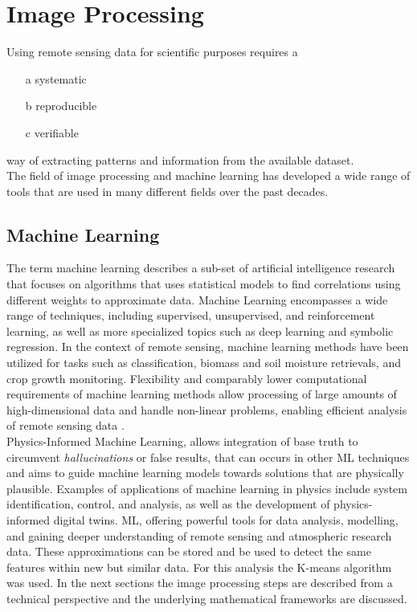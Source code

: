 \documentclass[12pt,a4paper, english,twoside]{scrartcl}
\begin{document}
\section{Image Processing}\label{sec:imgProcessing}
    Using remote sensing data for scientific purposes requires a 
    \begin{itemize} 
      \item[a] systematic
      \item[b] reproducible
      \item[c] verifiable 
    \end{itemize}%
    way of extracting patterns and information from the available dataset.\\
    The field of image processing and machine learning has developed a wide range of tools that are used in many different fields over the past decades. 
    \subsection{Machine Learning}\label{sec:ml}
      The term machine learning describes a sub-set of artificial intelligence research that focuses on algorithms that uses statistical models to find correlations using different weights to approximate data.
      Machine Learning encompasses a wide range of techniques, including supervised, unsupervised, and reinforcement learning, as well as more specialized topics such as deep learning and symbolic regression\autocite{Rodrigues2023}. 
      In the context of remote sensing, machine learning methods have been utilized for tasks such as classification, biomass and soil moisture retrievals, and crop growth monitoring.
      Flexibility and comparably lower computational requirements of machine learning methods allow processing of large amounts of high-dimensional data and handle non-linear problems, enabling efficient analysis of remote sensing data \autocite{Maxwell2018}.\\
      Physics-Informed Machine Learning, allows integration of base truth to circumvent \textit{hallucinations} or false results, that can occurs in other \gls{ML} techniques and aims to guide machine learning models towards solutions that are physically plausible.
      Examples of applications of machine learning in physics include system identification, control, and analysis, as well as the development of physics-informed digital twins. 
      \gls{ML}, offering powerful tools for data analysis, modelling, and gaining deeper understanding of remote sensing and atmospheric research data.
      These approximations can be stored and be used to detect the same features within new but similar data.
      For this analysis the K-means algorithm was used. 
      In the next sections the image processing steps are described from a technical perspective and the underlying mathematical frameworks are discussed.
\end{document}
